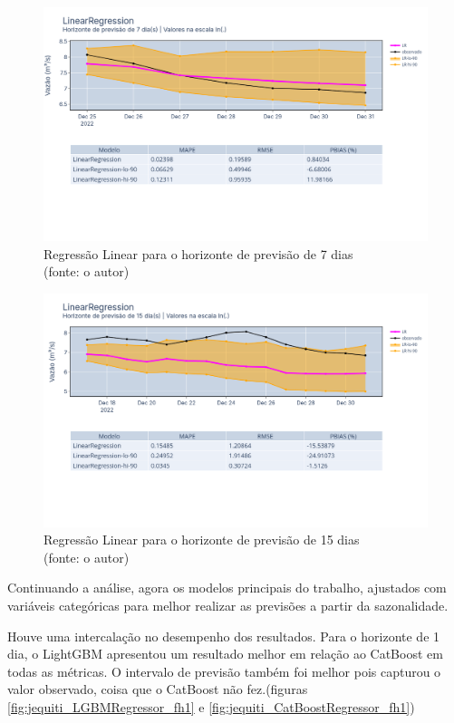 \begin{figure}[!h]
	\centering
	\includegraphics[scale=0.33]{Figuras/jequiti/resultados/LinearRegression_fh7.png}
	\caption{Regressão Linear para o horizonte de previsão de 7 dias\\(fonte: o autor)}
	\label{fig:jequiti_LinearRegression_fh7}
\end{figure}

\begin{figure}[!h]
	\centering
	\includegraphics[scale=0.33]{Figuras/jequiti/resultados/LinearRegression_fh15.png}
	\caption{Regressão Linear para o horizonte de previsão de 15 dias\\(fonte: o autor)}
	\label{fig:jequiti_LinearRegression_fh15}
\end{figure}

Continuando a análise, agora os modelos principais do trabalho, ajustados com variáveis categóricas para melhor realizar as previsões a partir da sazonalidade.

Houve uma intercalação no desempenho dos resultados. Para o horizonte de 1 dia, o LightGBM apresentou um resultado melhor em relação ao CatBoost em todas as métricas. O intervalo de previsão também foi melhor pois capturou o valor observado, coisa que o CatBoost não fez.(figuras \ref{fig:jequiti_LGBMRegressor_fh1} e \ref{fig:jequiti_CatBoostRegressor_fh1})

